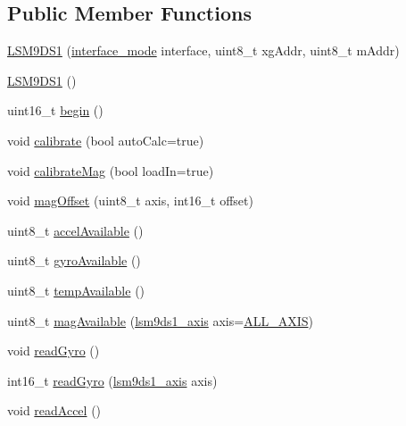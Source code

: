 \subsection*{Public Member Functions}
\begin{DoxyCompactItemize}
\item 
\hyperlink{class_l_s_m9_d_s1_ab62923063ffc49dca82e6f311c5c8764}{L\+S\+M9\+D\+S1} (\hyperlink{_l_s_m9_d_s1___types_8h_abd62c19dfd2401eba73af16c64296adf}{interface\+\_\+mode} interface, uint8\+\_\+t xg\+Addr, uint8\+\_\+t m\+Addr)
\item 
\hyperlink{class_l_s_m9_d_s1_a399a80ee541823b301e81d1afab32b28}{L\+S\+M9\+D\+S1} ()
\item 
uint16\+\_\+t \hyperlink{class_l_s_m9_d_s1_a8728e560c76bd120b3711af15a6ecbd6}{begin} ()
\item 
void \hyperlink{class_l_s_m9_d_s1_a97939cb15fcb7e33abcd6d3a9230d943}{calibrate} (bool auto\+Calc=true)
\item 
void \hyperlink{class_l_s_m9_d_s1_afb45f0bcbcbeb15d4bd1a28821b24d14}{calibrate\+Mag} (bool load\+In=true)
\item 
void \hyperlink{class_l_s_m9_d_s1_a0d461614bd058b082c94481dc916c18b}{mag\+Offset} (uint8\+\_\+t axis, int16\+\_\+t offset)
\item 
uint8\+\_\+t \hyperlink{class_l_s_m9_d_s1_a515ce6f5c199a86c6aa5be353b2a3a13}{accel\+Available} ()
\item 
uint8\+\_\+t \hyperlink{class_l_s_m9_d_s1_a65b71a03a30f4e8ed1ffd46de3db0560}{gyro\+Available} ()
\item 
uint8\+\_\+t \hyperlink{class_l_s_m9_d_s1_aaf6683c6f3f0281d5222b74f580f321b}{temp\+Available} ()
\item 
uint8\+\_\+t \hyperlink{class_l_s_m9_d_s1_a85afd29e95bead7b3f0083a9a235d1df}{mag\+Available} (\hyperlink{_spark_fun_l_s_m9_d_s1_8h_adcbc07abda18c22c46d0a1129bb61164}{lsm9ds1\+\_\+axis} axis=\hyperlink{_spark_fun_l_s_m9_d_s1_8h_adcbc07abda18c22c46d0a1129bb61164a8a4cd6c8a7401ef4e548059cf12006c0}{A\+L\+L\+\_\+\+A\+X\+IS})
\item 
void \hyperlink{class_l_s_m9_d_s1_a56e9710cb538a4c7f7ab94c2ca256ce9}{read\+Gyro} ()
\item 
int16\+\_\+t \hyperlink{class_l_s_m9_d_s1_adc1b37609a6c850328b16da4f911cefd}{read\+Gyro} (\hyperlink{_spark_fun_l_s_m9_d_s1_8h_adcbc07abda18c22c46d0a1129bb61164}{lsm9ds1\+\_\+axis} axis)
\item 
void \hyperlink{class_l_s_m9_d_s1_a9953684a1ff652a7d3a4d91e72bccaa1}{read\+Accel} ()
\item 

\end{DoxyCompactItemize}
